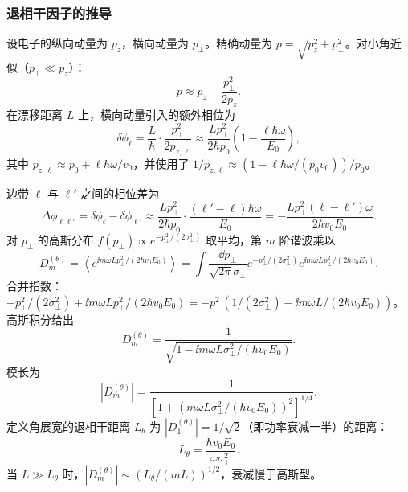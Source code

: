\subsubsection{退相干因子的推导}

设电子的纵向动量为 $p_z$，横向动量为 $p_\perp$。精确动量为 $p=\sqrt{p_z^2+p_\perp^2}$。对小角近似（$p_\perp\ll p_z$）：
\begin{equation}
p\approx p_z+\frac{p_\perp^2}{2p_z}.
\label{eq:feqo-transverse-momentum-expansion}
\end{equation}
在漂移距离 $L$ 上，横向动量引入的额外相位为
\begin{equation}
\delta\phi_\ell=\frac{L}{\hbar}\cdot\frac{p_\perp^2}{2p_{z,\ell}}
\approx\frac{Lp_\perp^2}{2\hbar p_0}\left(1-\frac{\ell\hbar\omega}{E_0}\right),
\label{eq:feqo-angular-phase}
\end{equation}
其中 $p_{z,\ell}\approx p_0+\ell\hbar\omega/v_0$，并使用了 $1/p_{z,\ell}\approx(1-\ell\hbar\omega/(p_0v_0))/p_0$。

边带 $\ell$ 与 $\ell'$ 之间的相位差为
\begin{equation}
\Delta\phi_{\ell\ell'}=\delta\phi_\ell-\delta\phi_{\ell'}
\approx\frac{Lp_\perp^2}{2\hbar p_0}\cdot\frac{(\ell'-\ell)\hbar\omega}{E_0}
=-\frac{Lp_\perp^2(\ell-\ell')\omega}{2\hbar v_0 E_0}.
\label{eq:feqo-angular-phase-diff}
\end{equation}
对 $p_\perp$ 的高斯分布 $f(p_\perp)\propto e^{-p_\perp^2/(2\sigma_\perp^2)}$ 取平均，第 $m$ 阶谐波乘以
\begin{equation}
D_m^{(\theta)}=\left\langle e^{\ii m\omega Lp_\perp^2/(2\hbar v_0 E_0)}\right\rangle
=\int\frac{\dd p_\perp}{\sqrt{2\pi}\sigma_\perp}
e^{-p_\perp^2/(2\sigma_\perp^2)}e^{\ii m\omega Lp_\perp^2/(2\hbar v_0 E_0)}.
\label{eq:feqo-angular-average}
\end{equation}
合并指数：$-p_\perp^2/(2\sigma_\perp^2)+\ii m\omega Lp_\perp^2/(2\hbar v_0 E_0)=-p_\perp^2(1/(2\sigma_\perp^2)-\ii m\omega L/(2\hbar v_0 E_0))$。高斯积分给出
\begin{equation}
D_m^{(\theta)}=\frac{1}{\sqrt{1-\ii m\omega L\sigma_\perp^2/(\hbar v_0 E_0)}}.
\label{eq:feqo-angular-damping}
\end{equation}
模长为
\begin{equation}
|D_m^{(\theta)}|=\frac{1}{\left[1+(m\omega L\sigma_\perp^2/(\hbar v_0 E_0))^2\right]^{1/4}}.
\label{eq:feqo-angular-damping-modulus}
\end{equation}
定义角展宽的退相干距离 $L_\theta$ 为 $|D_1^{(\theta)}|=1/\sqrt{2}$（即功率衰减一半）的距离：
\begin{equation}
L_\theta=\frac{\hbar v_0 E_0}{\omega\sigma_\perp^2}.
\label{eq:feqo-Ltheta-def}
\end{equation}
当 $L\gg L_\theta$ 时，$|D_m^{(\theta)}|\sim(L_\theta/(mL))^{1/2}$，衰减慢于高斯型。


